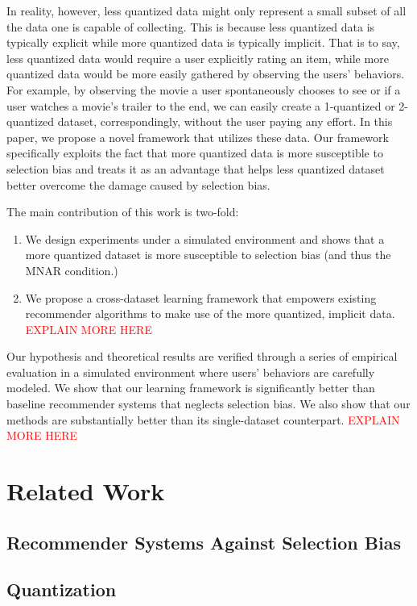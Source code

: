 \documentclass{article}
\begin{document}
In reality, however, less quantized data might only represent a small subset of all the data one is capable of collecting. This is because less quantized data is typically explicit while more quantized data is typically implicit. That is to say, less quantized data would require a user explicitly rating an item, while more quantized data would be more easily gathered by observing the users' behaviors. For example, by observing the movie a user spontaneously chooses to see or if a user watches a movie's trailer to the end, we can easily create a 1-quantized or 2-quantized dataset, correspondingly, without the user paying any effort. In this paper, we propose a novel framework that utilizes these data. Our framework specifically exploits the fact that more quantized data is more susceptible to selection bias and treats it as an advantage that helps less quantized dataset better overcome the damage caused by selection bias.

The main contribution of this work is two-fold:
\begin{enumerate}
  \item We design experiments under a simulated environment and shows that a more quantized dataset is more susceptible to selection bias (and thus the MNAR condition.)
  \item We propose a cross-dataset learning framework that empowers existing recommender algorithms to make use of the more quantized, implicit data. \textcolor{red}{EXPLAIN MORE HERE}
\end{enumerate}

Our hypothesis and theoretical results are verified through a series of empirical evaluation in a simulated environment where users' behaviors are carefully modeled. We show that our learning framework is significantly better than baseline recommender systems that neglects selection bias. We also show that our methods are substantially better than its single-dataset counterpart. \textcolor{red}{EXPLAIN MORE HERE}

\section{Related Work}

\subsection{Recommender Systems Against Selection Bias}

\subsection{Quantization}
\end{document}
